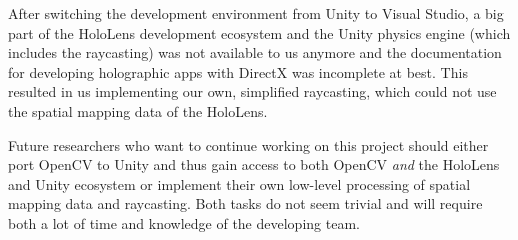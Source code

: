 After switching the development environment from Unity to Visual Studio, a big part of the HoloLens development ecosystem and the Unity physics engine (which includes the raycasting) was not available to us anymore and the documentation for developing holographic apps with DirectX was incomplete at best.
This resulted in us implementing our own, simplified raycasting, which could not use the spatial mapping data of the HoloLens.

Future researchers who want to continue working on this project should either port OpenCV to Unity and thus gain access to both OpenCV \emph{and} the HoloLens and Unity ecosystem or implement their own low-level processing of spatial mapping data and raycasting. Both tasks do not seem trivial and will require both a lot of time and knowledge of the developing team.

